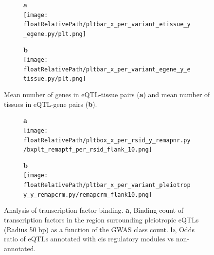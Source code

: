 %
%
\begin{figure}[!tbp]
\centering
%
\begin{subfigure}[]{.32\textwidth}
\textbf{a}
\\
\texttt{[image: \\floatRelativePath/pltbar\_x\_per\_variant\_etissue\_y\_egene.py/plt.png]}
\end{subfigure}
%
\begin{subfigure}[]{.32\textwidth}
\textbf{b}
\\
\texttt{[image: \\floatRelativePath/pltbar\_x\_per\_variant\_egene\_y\_etissue.py/plt.png]}
\end{subfigure}
%
%
\caption{Mean number of genes in eQTL-tissue pairs (\textbf{a}) and mean number of tissues in eQTL-gene pairs (\textbf{b}).} \label{fig:gwas_egene_etisue_per_variant}
%
\end{figure}


\begin{figure}[!tbp]
\centering
%
\begin{subfigure}[]{.33\textwidth}
\textbf{a}
\\
\texttt{[image: \\floatRelativePath/pltbox\_x\_per\_rsid\_y\_remapnr.py/bxplt\_remaptf\_per\_rsid\_flank\_10.png]}
\end{subfigure}
%
\begin{subfigure}[]{.33\textwidth}
\textbf{b}
\\
\texttt{[image: \\floatRelativePath/pltbar\_x\_per\_variant\_pleiotropy\_y\_remapcrm.py/remapcrm\_flank10.png]}
\end{subfigure}
%
\caption{Analysis of transcription factor binding.
\textbf{a}, Binding count of transcription factors in the region surrounding pleiotropic eQTLs (Radius 50 bp) as a function of the GWAS class count.
\textbf{b}, Odds ratio of eQTLs annotated with cis regulatory modules vs non-annotated.} \label{fig:freq_tf_per_variant}
%
\end{figure}

